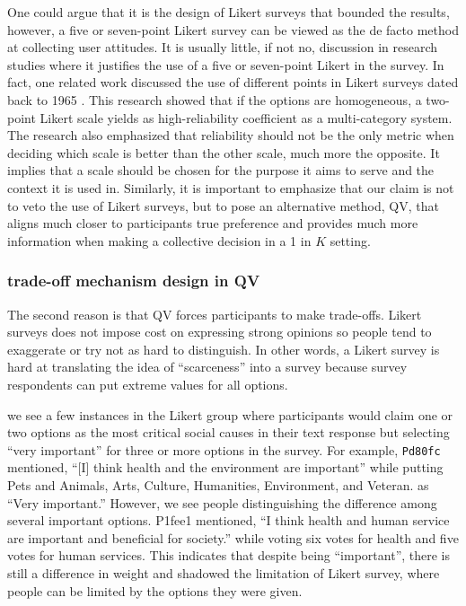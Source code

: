 One could argue that it is the design of Likert surveys that bounded the results, however,
a five or seven-point Likert survey can be viewed as the de facto method at collecting user attitudes.
It is usually little, if not no, discussion in research studies where it justifies the use of a five or seven-point Likert in the survey.
In fact, one related work discussed the use of different points in Likert surveys dated back to 1965 \cite{komorita1965number}. 
This research showed that if the options are homogeneous, a two-point Likert scale yields as high-reliability coefficient as a multi-category system.
The research also emphasized that reliability should not be the only metric when deciding which scale is better than the other scale, much more the opposite.
It implies that a scale should be chosen for the purpose it aims to serve and the context it is used in.
Similarly, it is important to emphasize that our claim is not to veto the use of Likert surveys, but to pose an alternative method, QV, that aligns much closer to participants true preference and provides much more information when making a collective decision in a 1 in $K$ setting.

\subsubsection{trade-off mechanism design in QV}
The second reason is that
QV forces participants to make trade-offs.
Likert surveys does not impose cost 
on expressing strong opinions 
so people tend to exaggerate 
or try not as hard to distinguish. 
In other words,
a Likert survey is hard 
at translating the idea of ``scarceness'' 
into a survey 
because survey respondents can put extreme values 
for all options. 

we see a few instances in the Likert group 
where participants would claim one or two options 
as the most critical social causes in their text response 
but selecting ``very important'' for 
three or more options in the survey.
For example, \texttt{Pd80fc} mentioned, ``[I] think health and the environment are important'' while putting Pets and Animals, Arts, Culture, Humanities, Environment, and Veteran. as ``Very important.''
However, we see people distinguishing the difference
among several important options.
P1fee1 mentioned, ``I think health and human service are important and beneficial for society.'' while voting six votes for health and five votes for human services. This indicates that despite being ``important'', there is still a difference in weight and shadowed the limitation of Likert survey, where people can be limited by the options they were given.

